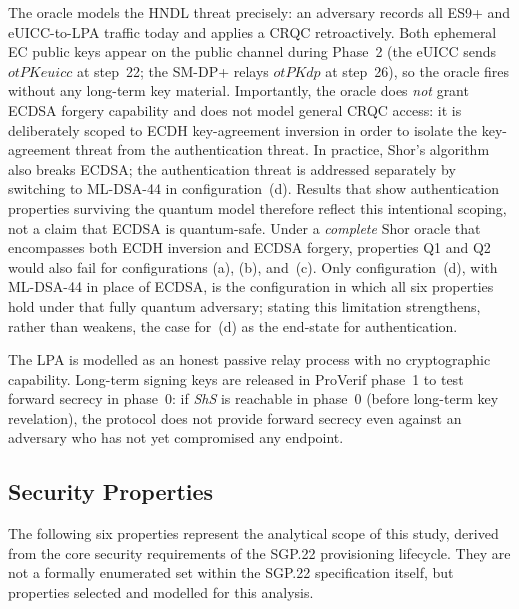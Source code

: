 \documentclass[a4paper,fleqn]{cas-sc}
\begin{document}
The oracle models the HNDL threat precisely: an adversary records all
ES9+ and eUICC-to-LPA traffic today and applies a CRQC retroactively.
Both ephemeral EC public keys appear on the public channel during
Phase~2 (the eUICC sends $\mathit{otPKeuicc}$ at step~22; the SM-DP+
relays $\mathit{otPKdp}$ at step~26), so the oracle fires without any
long-term key material. Importantly, the oracle does \emph{not} grant
ECDSA forgery capability and does not model general CRQC access: it is
deliberately scoped to ECDH key-agreement inversion in order to isolate
the key-agreement threat from the authentication threat. In practice,
Shor's algorithm also breaks ECDSA; the authentication threat is addressed
separately by switching to ML-DSA-44 in configuration~(d). Results that
show authentication properties surviving the quantum model therefore reflect
this intentional scoping, not a claim that ECDSA is quantum-safe.
Under a \emph{complete} Shor oracle that encompasses both ECDH inversion
and ECDSA forgery, properties Q1 and Q2 would also fail for
configurations (a), (b), and~(c). Only configuration~(d), with ML-DSA-44
in place of ECDSA, is the configuration in which all six properties hold
under that fully quantum adversary; stating this limitation strengthens,
rather than weakens, the case for~(d) as the end-state for authentication.

The LPA is modelled as an honest passive relay process with no
cryptographic capability. Long-term signing keys are released in
ProVerif phase~1 to test forward secrecy in phase~0: if \textit{ShS}
is reachable in phase~0 (before long-term key revelation), the
protocol does not provide forward secrecy even against an adversary
who has not yet compromised any endpoint.

\subsection{Security Properties}
\label{sec:fv-props}

The following six properties represent the analytical scope of this
study, derived from the core security requirements of the SGP.22
provisioning lifecycle. They are not a formally enumerated set within
the SGP.22 specification itself, but properties selected and modelled
for this analysis.
\end{document}
